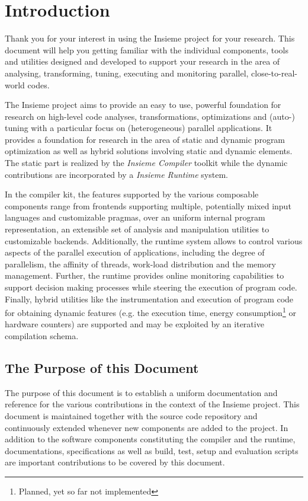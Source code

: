 \chapter{Introduction} \label{cap:introduction}

Thank you for your interest in using the Insieme \cite{insieme} project for your
research. This document will help you getting familiar with the individual
components, tools and utilities designed and developed to support your research
in the area of analysing, transforming, tuning, executing and monitoring
parallel, close-to-real-world codes.


The Insieme project aims to provide an easy to use, powerful foundation for
research on high-level code analyses, transformations, optimizations and (auto-)
tuning with a particular focus on (heterogeneous) parallel applications.
It provides a foundation for research in the area of static and dynamic
program optimization as well as hybrid solutions involving static and
dynamic elements. The static part is realized by the \textit{Insieme Compiler}
toolkit while the dynamic contributions are incorporated by a
\textit{Insieme Runtime} system.   

 
In the compiler kit, the features supported by the various composable components
range from frontends supporting multiple, potentially mixed input languages and
customizable pragmas, over an uniform internal program representation, an
extensible set of analysis and manipulation utilities to customizable backends.
Additionally, the runtime system allows to control various aspects of the
parallel execution of applications, including the degree of parallelism, the
affinity of threads, work-load distribution and the memory management. Further,
the runtime provides online monitoring capabilities to support decision making
processes while steering the execution of program code. Finally, hybrid
utilities like the instrumentation and execution of program code for obtaining
dynamic features (e.g. the execution time, energy consumption\footnote{Planned,
yet so far not implemented} or hardware counters) are supported and may be
exploited by an iterative compilation schema.

\section{The Purpose of this Document}
The purpose of this document is to establish a uniform documentation and
reference for the various contributions in the context of the Insieme project.
This document is maintained together with the source code repository and
continuously extended whenever new components are added to the project. In
addition to the software components constituting the compiler and the runtime,
documentations, specifications as well as build, test, setup and evaluation
scripts are important contributions to be covered by this
document.


